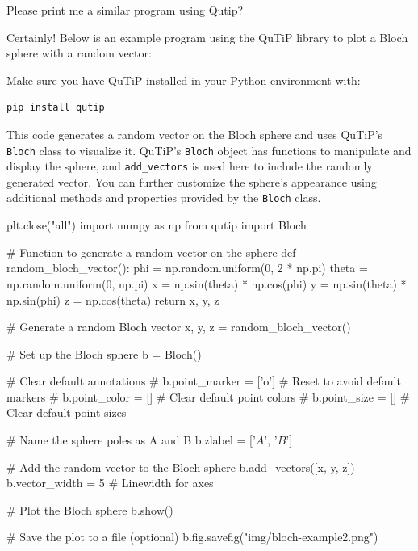 \begin{ai}
Please print me a similar program using Qutip?
\end{ai}

\begin{airesult}
Certainly! Below is an example program using the QuTiP library to plot a Bloch sphere with a random
vector:

\vsp

Make sure you have QuTiP installed in your Python environment with:
\begin{verbatim}
pip install qutip
\end{verbatim}

This code generates a random vector on the Bloch sphere and uses QuTiP's \verb|Bloch| class to
visualize
it. QuTiP's \verb|Bloch| object has functions to manipulate and display the sphere, and
\verb|add_vectors| is
used here to include the randomly generated vector. You can further customize the sphere's
appearance using additional methods and properties provided by the \verb|Bloch| class.
\end{airesult}


  \begin{python}
  plt.close("all")
  import numpy as np
  from qutip import Bloch

  # Function to generate a random vector on the sphere
  def random_bloch_vector():
      phi = np.random.uniform(0, 2 * np.pi)
      theta = np.random.uniform(0, np.pi)
      x = np.sin(theta) * np.cos(phi)
      y = np.sin(theta) * np.sin(phi)
      z = np.cos(theta)
      return x, y, z

  # Generate a random Bloch vector
  x, y, z = random_bloch_vector()

  # Set up the Bloch sphere
  b = Bloch()

  # Clear default annotations
  # b.point_marker = ['o']  # Reset to avoid default markers
  # b.point_color = []      # Clear default point colors
  # b.point_size = []       # Clear default point sizes

  # Name the sphere poles as A and B
  b.zlabel = ['$A$', '$B$']

  # Add the random vector to the Bloch sphere
  b.add_vectors([x, y, z])
  b.vector_width = 5  # Linewidth for axes

  # Plot the Bloch sphere
  b.show()

  # Save the plot to a file (optional)
  b.fig.savefig("img/bloch-example2.png")
  \end{python}

